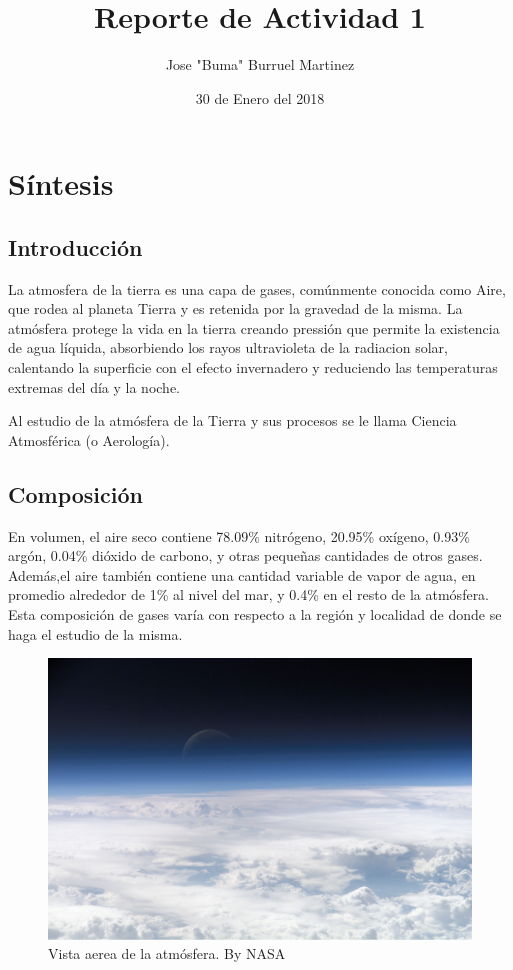 \documentclass{article}
\title{Reporte de Actividad 1}
\author{Jose "Buma" Burruel Martinez}
\date{30 de Enero del 2018}
\begin{document}

\section{Síntesis}

\subsection{Introducción}
La atmosfera de la tierra es una capa de gases, comúnmente conocida como Aire, que rodea al planeta Tierra y es retenida por la gravedad de la misma. La atmósfera protege la vida en la tierra creando pressión que permite la existencia de agua líquida, absorbiendo los rayos ultravioleta de la radiacion solar, calentando la superficie con el efecto invernadero y reduciendo las temperaturas extremas del día y la noche.


Al estudio de la atmósfera de la Tierra y sus procesos se le llama Ciencia Atmosférica (o Aerología).

\subsection{Composición}
En volumen, el aire seco contiene 78.09\% nitrógeno, 20.95\% oxígeno, 0.93\% argón, 0.04\% dióxido de carbono, y otras pequeñas cantidades de otros gases. Además,el aire también contiene una cantidad variable de vapor de agua, en promedio alrededor de 1\% al nivel del mar, y 0.4\% en el resto de la atmósfera. Esta composición de gases  varía con respecto a la región y localidad de donde se haga el estudio de la misma.

\begin{figure}
    \includegraphics[width=\linewidth]{Top_of_Atmosphere.jpg}
    \caption{Vista aerea de la atmósfera. By NASA}
    \label{fig:foto1}
\end{figure}
    
\end{document}
